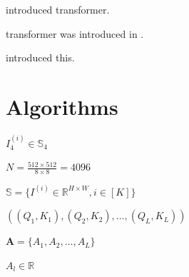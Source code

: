 \documentclass[10pt, a4paper]{article} %
\begin{document}
\nocite{axfors2021association}   %

\citet{vaswani2017attention} introduced transformer.

transformer was introduced in \citeyear{vaswani2017attention}.

\citeauthor{jarvis2014whole} introduced this.

\section{Algorithms}

$I^{(i)}_{4} \in \mathbb{S}_{4}$ 



$N = \frac{512 \times 512}{8 \times 8} = 4096$

$\mathbb{S} = \{I^{(i)} \in \mathbb{R}^{H \times W} , i \in [K] \}$

$((Q_1,K_1),(Q_2,K_2),\dots,(Q_L,K_L) )$

$\boldsymbol{A} =\{A_1, A_2, \dots , A_L\}$

$A_l \in \mathbb{R}^{} $



\end{document}
